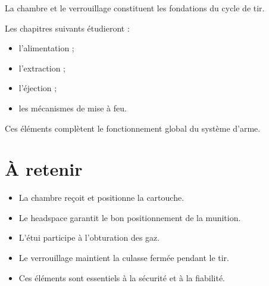 La chambre et le verrouillage constituent les fondations du cycle de tir.

Les chapitres suivants étudieront :

\begin{itemize}
    \item l'alimentation ;
    \item l'extraction ;
    \item l'éjection ;
    \item les mécanismes de mise à feu.
\end{itemize}

Ces éléments complètent le fonctionnement global du système d'arme.

\section{À retenir}

\begin{aretenir}

\begin{itemize}
    \item La chambre reçoit et positionne la cartouche.
    \item Le headspace garantit le bon positionnement de la munition.
    \item L'étui participe à l'obturation des gaz.
    \item Le verrouillage maintient la culasse fermée pendant le tir.
    \item Ces éléments sont essentiels à la sécurité et à la fiabilité.
\end{itemize}

\end{aretenir}
